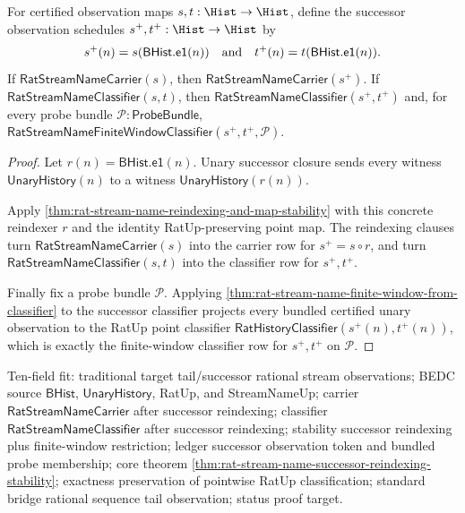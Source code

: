 \begin{theorem}
\label{thm:rat-stream-name-successor-reindexing-stability}
For certified observation maps $s,t:\Hist\to\Hist$, define the successor
observation schedules $s^+,t^+:\Hist\to\Hist$ by
$$
s^+(n)=s(\mathsf{BHist.e1}(n))
\quad\hbox{and}\quad
t^+(n)=t(\mathsf{BHist.e1}(n)).
$$
If $\mathsf{RatStreamNameCarrier}(s)$, then
$\mathsf{RatStreamNameCarrier}(s^+)$. If
$\mathsf{RatStreamNameClassifier}(s,t)$, then
$\mathsf{RatStreamNameClassifier}(s^+,t^+)$ and, for every probe bundle
$\mathcal{P}:\mathsf{ProbeBundle}$,
$\mathsf{RatStreamNameFiniteWindowClassifier}(s^+,t^+,\mathcal{P})$.
\end{theorem}
\begin{proof}
Let $r(n)=\mathsf{BHist.e1}(n)$. Unary successor closure sends every witness
$\mathsf{UnaryHistory}(n)$ to a witness
$\mathsf{UnaryHistory}(r(n))$.

Apply \autoref{thm:rat-stream-name-reindexing-and-map-stability} with this
concrete reindexer $r$ and the identity RatUp-preserving point map. The
reindexing clauses turn $\mathsf{RatStreamNameCarrier}(s)$ into the carrier row
for $s^+=s\circ r$, and turn $\mathsf{RatStreamNameClassifier}(s,t)$ into the
classifier row for $s^+,t^+$.

Finally fix a probe bundle $\mathcal{P}$. Applying
\autoref{thm:rat-stream-name-finite-window-from-classifier} to the successor
classifier projects every bundled certified unary observation to the RatUp
point classifier
$\mathsf{RatHistoryClassifier}(s^+(n),t^+(n))$, which is exactly the
finite-window classifier row for $s^+,t^+$ on $\mathcal{P}$.
\end{proof}

Ten-field fit: traditional target tail/successor rational stream observations;
BEDC source $\mathsf{BHist}$, $\mathsf{UnaryHistory}$, RatUp, and
StreamNameUp; carrier $\mathsf{RatStreamNameCarrier}$ after successor
reindexing; classifier $\mathsf{RatStreamNameClassifier}$ after successor
reindexing; stability successor reindexing plus finite-window restriction;
ledger successor observation token and bundled probe membership; core theorem
\autoref{thm:rat-stream-name-successor-reindexing-stability}; exactness
preservation of pointwise RatUp classification; standard bridge rational
sequence tail observation; status proof target.

